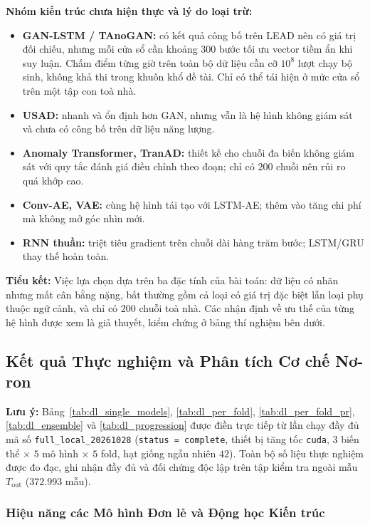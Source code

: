 \noindent\textbf{Nhóm kiến trúc chưa hiện thực và lý do loại trừ:}
\begin{itemize}
    \item \textbf{GAN-LSTM / TAnoGAN:} có kết quả công bố trên LEAD nên có giá trị đối chiếu, nhưng mỗi cửa sổ cần khoảng $300$ bước tối ưu vector tiềm ẩn khi suy luận. Chấm điểm từng giờ trên toàn bộ dữ liệu cần cỡ $10^8$ lượt chạy bộ sinh, không khả thi trong khuôn khổ đề tài. Chỉ có thể tái hiện ở mức cửa sổ trên một tập con toà nhà.
    \item \textbf{USAD:} nhanh và ổn định hơn GAN, nhưng vẫn là hệ hình không giám sát và chưa có công bố trên dữ liệu năng lượng.
    \item \textbf{Anomaly Transformer, TranAD:} thiết kế cho chuỗi đa biến không giám sát với quy tắc đánh giá điều chỉnh theo đoạn; chỉ có $200$ chuỗi nên rủi ro quá khớp cao.
    \item \textbf{Conv-AE, VAE:} cùng hệ hình tái tạo với LSTM-AE; thêm vào tăng chi phí mà không mở góc nhìn mới.
    \item \textbf{RNN thuần:} triệt tiêu gradient trên chuỗi dài hàng trăm bước; LSTM/GRU thay thế hoàn toàn.
\end{itemize}

\noindent\textbf{Tiểu kết:} Việc lựa chọn dựa trên ba đặc tính của bài toán: dữ liệu có nhãn nhưng mất cân bằng nặng, bất thường gồm cả loại có giá trị đặc biệt lẫn loại phụ thuộc ngữ cảnh, và chỉ có $200$ chuỗi toà nhà. Các nhận định về ưu thế của từng hệ hình được xem là giả thuyết, kiểm chứng ở bảng thí nghiệm bên dưới.

\subsection{Kết quả Thực nghiệm và Phân tích Cơ chế Nơ-ron}

\textbf{Lưu ý:} Bảng~\ref{tab:dl_single_models}, \ref{tab:dl_per_fold}, \ref{tab:dl_per_fold_pr}, \ref{tab:dl_ensemble} và \ref{tab:dl_progression} được điền trực tiếp từ lần chạy đầy đủ mã số \texttt{full\_local\_20261028} (\texttt{status = complete}, thiết bị tăng tốc \texttt{cuda}, $3$ biến thể $\times$ $5$ mô hình $\times$ $5$ fold, hạt giống ngẫu nhiên $42$). Toàn bộ số liệu thực nghiệm được đo đạc, ghi nhận đầy đủ và đối chứng độc lập trên tập kiểm tra ngoài mẫu $T_{\text{out}}$ ($372.993$ mẫu).

\subsubsection{Hiệu năng các Mô hình Đơn lẻ và Động học Kiến trúc}

